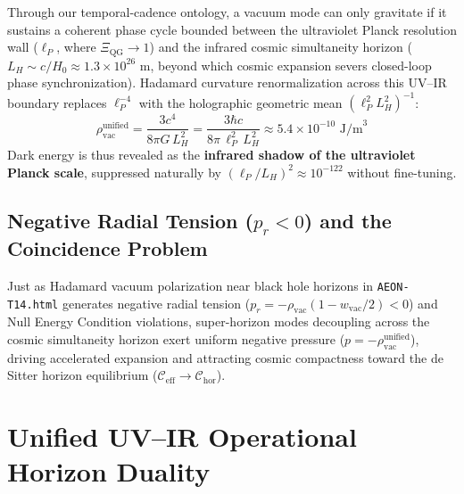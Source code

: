 \documentclass[11pt,a4paper]{article}
\begin{document}
Through our temporal-cadence ontology, a vacuum mode can only gravitate if it sustains a coherent phase cycle bounded between the ultraviolet Planck resolution wall ($\ell_P$, where $\Xi_{\mathrm{QG}} \to 1$) and the infrared cosmic simultaneity horizon ($L_H \sim c/H_0 \approx 1.3 \times 10^{26}\text{ m}$, beyond which cosmic expansion severs closed-loop phase synchronization). Hadamard curvature renormalization across this UV--IR boundary replaces $\ell_P^{-4}$ with the holographic geometric mean $(\ell_P^2 L_H^2)^{-1}$:
\begin{equation}
    \rho_{\mathrm{vac}}^{\mathrm{unified}} = \frac{3 c^4}{8\pi G \, L_H^2} = \frac{3\hbar c}{8\pi \, \ell_P^2 \, L_H^2} \approx 5.4 \times 10^{-10}\text{ J/m}^3
\end{equation}
Dark energy is thus revealed as the \textbf{infrared shadow of the ultraviolet Planck scale}, suppressed naturally by $(\ell_P / L_H)^2 \approx 10^{-122}$ without fine-tuning.

\subsection{Negative Radial Tension ($p_r < 0$) and the Coincidence Problem}
Just as Hadamard vacuum polarization near black hole horizons in \texttt{AEON-T14.html} generates negative radial tension ($p_r = -\rho_{\mathrm{vac}}(1 - w_{\mathrm{vac}}/2) < 0$) and Null Energy Condition violations, super-horizon modes decoupling across the cosmic simultaneity horizon \cite{gh1977} exert uniform negative pressure ($p = -\rho_{\mathrm{vac}}^{\mathrm{unified}}$), driving accelerated expansion and attracting cosmic compactness toward the de Sitter horizon equilibrium ($\mathcal{C}_{\mathrm{eff}} \to \mathcal{C}_{\mathrm{hor}}$).

\section{Unified UV--IR Operational Horizon Duality}
\end{document}
